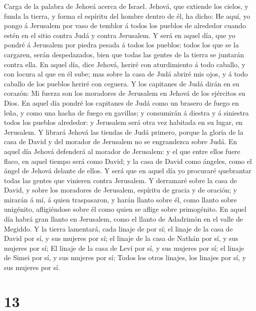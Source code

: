  Carga de la palabra de Jehová acerca de Israel. Jehová, que
extiende los cielos, y funda la tierra, y forma el espíritu del hombre
dentro de él, ha dicho:  He aquí, yo pongo á Jerusalem por
vaso de temblor á todos los pueblos de alrededor cuando estén en el
sitio contra Judá y contra Jerusalem.  Y será en aquel día,
que yo pondré á Jerusalem por piedra pesada á todos los pueblos: todos
los que se la cargaren, serán despedazados, bien que todas las gentes de
la tierra se juntarán contra ella.  En aquel día, dice
Jehová, heriré con aturdimiento á todo caballo, y con locura al que en
él sube; mas sobre la casa de Judá abriré mis ojos, y á todo caballo de
los pueblos heriré con ceguera.  Y los capitanes de Judá
dirán en su corazón: Mi fuerza son los moradores de Jerusalem en Jehová
de los ejércitos su Dios.  En aquel día pondré los capitanes
de Judá como un brasero de fuego en leña, y como una hacha de fuego en
gavillas; y consumirán á diestra y á siniestra todos los pueblos
alrededor: y Jerusalem será otra vez habitada en su lugar, en Jerusalem.
 Y librará Jehová las tiendas de Judá primero, porque la
gloria de la casa de David y del morador de Jerusalem no se engrandezca
sobre Judá.  En aquel día Jehová defenderá al morador de
Jerusalem: y el que entre ellos fuere flaco, en aquel tiempo será como
David; y la casa de David como ángeles, como el ángel de Jehová delante
de ellos.  Y será que en aquel día yo procuraré quebrantar
todas las gentes que vinieren contra Jerusalem.  Y
derramaré sobre la casa de David, y sobre los moradores de Jerusalem,
espíritu de gracia y de oración; y mirarán á mí, á quien traspasaron, y
harán llanto sobre él, como llanto sobre unigénito, afligiéndose sobre
él como quien se aflige sobre primogénito.  En aquel día
habrá gran llanto en Jerusalem, como el llanto de Adadrimón en el valle
de Megiddo.  Y la tierra lamentará, cada linaje de por sí;
el linaje de la casa de David por sí, y sus mujeres por sí; el linaje de
la casa de Nathán por sí, y sus mujeres por sí;  El linaje
de la casa de Leví por sí, y sus mujeres por sí; el linaje de Simei por
sí, y sus mujeres por sí;  Todos los otros linajes, los
linajes por sí, y sus mujeres por sí.

\hypertarget{section-12}{%
\section{13}\label{section-12}}


